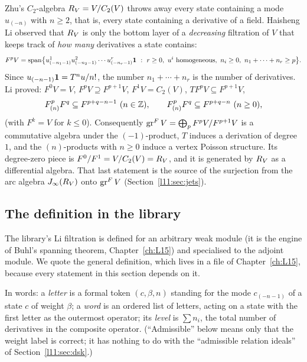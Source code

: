 Zhu's $C_2$-algebra $R_V = V/C_2(V)$ throws away every state containing a mode $u_{(-n)}$ with
$n\ge2$, that is, every state containing a derivative of a field. Haisheng Li observed that $R_V$
is only the bottom layer of a \emph{decreasing} filtration of $V$ that keeps track of \emph{how many}
derivatives a state contains:
\begin{equation}\label{l11:eq:lidef}
F^pV = \operatorname{span}\bigl\{u^1_{(-n_1-1)}u^2_{(-n_2-1)}\cdots u^r_{(-n_r-1)}\mathbf{1}\ :\
r\ge0,\ u^i\text{ homogeneous},\ n_i\ge0,\ n_1+\cdots+n_r\ge p\bigr\}.
\end{equation}
Since $u_{(-n-1)}\mathbf{1} = T^nu/n!$, the number $n_1+\cdots+n_r$ is the number of derivatives. Li
proved: $F^0V = V$, $F^pV\supseteq F^{p+1}V$, $F^1V = C_2(V)$, $T F^pV\subseteq F^{p+1}V$,
\begin{equation}\label{l11:eq:limult}
F^p_{(n)}F^q\subseteq F^{p+q-n-1}\ (n\in{\mathbb{Z}}),\qquad F^p_{(n)}F^q\subseteq F^{p+q-n}\ (n\ge0),
\end{equation}
(with $F^{k} = V$ for $k\le0$). Consequently $\operatorname{gr}^FV = \bigoplus_pF^pV/F^{p+1}V$ is a commutative
algebra under the $(-1)$-product, $T$ induces a derivation of degree $1$, and the $(n)$-products with
$n\ge0$ induce a vertex Poisson structure. Its degree-zero piece is $F^0/F^1 = V/C_2(V) = R_V$, and
it is generated by $R_V$ as a differential algebra. That last statement is the source of the
surjection from the arc algebra $J_\infty(R_V)$ onto $\operatorname{gr}^FV$
(Section~\ref{l11:sec:jets}).

\subsection{The definition in the library}

The library's Li filtration is defined for an arbitrary weak module (it is the engine of Buhl's spanning
theorem, Chapter~\ref{ch:L15}) and specialised to the adjoint module. We quote the general definition,
which lives in a file of Chapter~\ref{ch:L15}, because every statement in this section depends on it.

In words: a \emph{letter} is a formal token $(c,\beta,n)$ standing for the mode $c_{(-n-1)}$ of a state $c$ of weight $\beta$; a
\emph{word} is an ordered list of letters, acting on a state with the first letter as the outermost operator; its \emph{level} is
$\sum n_i$, the total number of derivatives in the composite operator. (``Admissible'' below means only that the weight label is
correct; it has nothing to do with the ``admissible relation ideals'' of Section~\ref{l11:sec:dsk}.)

